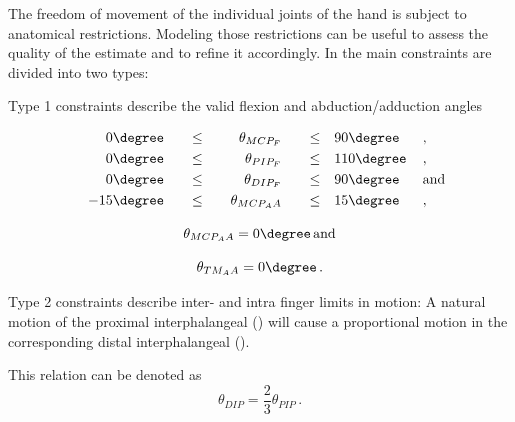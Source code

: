 	The freedom of movement of the individual joints of the hand is subject to anatomical restrictions. Modeling those restrictions can be useful to assess the quality of the estimate and to refine it accordingly. In \cite{Lin2000} the main constraints are divided into two types: 
	
	Type 1 constraints describe the valid flexion and abduction/adduction angles
	
	\begin{alignat}{7}
		&&0\degree \quad &&\leq \quad &&\theta_{MCP_F} \quad &&\leq \quad &90\degree\, &&,\\
		&&0\degree \quad &&\leq \quad &&\theta_{PIP_F} \quad &&\leq \quad &110\degree\,&& ,\\
		&&0\degree \quad &&\leq \quad &&\theta_{DIP_F} \quad &&\leq \quad &90\degree\, && \text{and}\\
		&&-15\degree \quad &&\leq \quad &&\theta_{MCP_AA} \quad &&\leq \quad &15\degree\, &&,
	\end{alignat}
	
	\begin{equation}
	\theta_{MCP_AA} = 0\degree\, \text{and}
	\end{equation}

	\begin{equation}
	\theta_{TM_AA} = 0\degree\,.
	\end{equation}
	
	Type 2 constraints describe inter- and intra finger limits in motion:
	A natural motion of the proximal interphalangeal () will cause a proportional motion in the corresponding distal interphalangeal ().
	
	This relation can be denoted as 
	\begin{equation}
	\theta_{DIP} = \frac{2}{3}\theta_{PIP}\,.
	\end{equation}
	



	